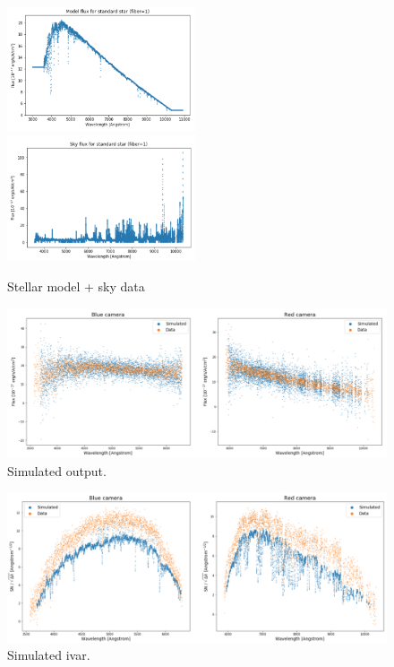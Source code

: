 \begin{figure}[h]
    \centering
    \includegraphics[width=0.495\textwidth]{images/specsim/stellar_model_4055_55359_1.png}
    \includegraphics[width=0.495\textwidth]{images/specsim/sky_flux_4055_55359_1.png}
    \caption{Stellar model + sky data}
    \label{fig:star_sky}
\end{figure}

\begin{figure}[h]
\centering
\includegraphics[width=17cm]{images/specsim/simulated_output_4055_55359_1.png}
\caption{Simulated output.}
\label{fig:simulated_flux}
\end{figure}

\begin{figure}[h]
\centering
\includegraphics[width=16cm]{images/specsim/ivar_4055_55359_1.png}
\caption{Simulated ivar.}
\label{fig:simulated_ivar}
\end{figure}

